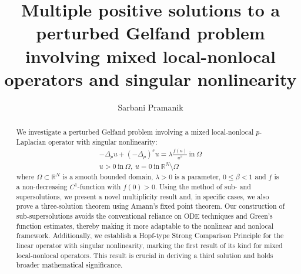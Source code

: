 \documentclass[reqno,oneside]{amsart}
\theoremstyle{definition}
\theoremstyle{remark}
\numberwithin{equation}{section}
\newcommand{\la} {\lambda}
\begin{document}
\title[Multiplicity results for mixed local-nonlocal operators]{Multiple positive solutions to a perturbed Gelfand problem involving mixed local-nonlocal operators and singular nonlinearity}

\author{Sarbani Pramanik}

\address{School of Mathematics, Indian Institute of Science Education and Research Thiruvananthapuram, Maruthamala, Thiruvananthapuram, Kerala, 695551, India.}



\begin{abstract}

We investigate a perturbed Gelfand problem involving a mixed local-nonlocal $p$-Laplacian operator with singular nonlinearity:
\begin{equation*}
\begin{aligned}
    -\Delta_p u + (-\Delta_p)^s u = \lambda \frac{f(u)}{u^{\beta}}\ \text{in} \ \Omega\\
    u >0\ \text{in} \ \Omega,\ u =0\ \text{in} \ \mathbb{R}^N \setminus \Omega
\end{aligned}
\end{equation*}
where $\Omega \subset \mathbb{R}^N$ is a smooth bounded domain, $\la > 0 $ is a parameter, $0\leq \beta<1$ and $f$ is a non-decreasing $C^1$-function with $f(0)>0$. Using the method of sub- and supersolutions, we present a novel multiplicity result and, in specific cases, we also prove a three-solution theorem using Amann's fixed point theorem. Our construction of sub-supersolutions avoids the conventional reliance on ODE techniques and Green's function estimates, thereby making it more adaptable to the nonlinear and nonlocal framework. Additionally, we establish a Hopf-type Strong Comparison Principle for the linear operator with singular nonlinearity, marking the first result of its kind for mixed local-nonlocal operators. This result is crucial in deriving a third solution and holds broader mathematical significance.

\end{abstract}

\maketitle
\end{document}
